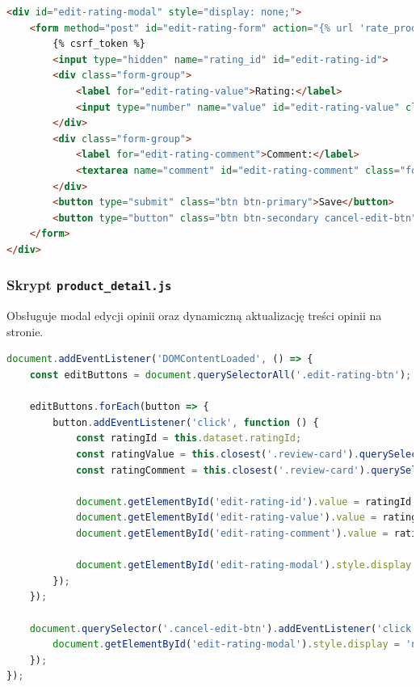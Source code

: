 \documentclass[12pt,a4paper,oneside]{article}
\theoremstyle{definition}
\numberwithin{equation}{section}
\begin{document}
\begin{lstlisting}[language=HTML, caption=Fragment \texttt{product\_detail.html}]
<div id="edit-rating-modal" style="display: none;">
    <form method="post" id="edit-rating-form" action="{% url 'rate_product' product.id %}" data-product-id="{{ product.id }}">
        {% csrf_token %}
        <input type="hidden" name="rating_id" id="edit-rating-id">
        <div class="form-group">
            <label for="edit-rating-value">Rating:</label>
            <input type="number" name="value" id="edit-rating-value" class="form-control" min="1" max="5" required>
        </div>
        <div class="form-group">
            <label for="edit-rating-comment">Comment:</label>
            <textarea name="comment" id="edit-rating-comment" class="form-control"></textarea>
        </div>
        <button type="submit" class="btn btn-primary">Save</button>
        <button type="button" class="btn btn-secondary cancel-edit-btn">Cancel</button>
    </form>
</div>
\end{lstlisting}



\subsubsection{Skrypt \texttt{product\_detail.js}}
Obsługuje modal edycji opinii oraz dynamiczną aktualizację treści opinii na stronie.

\begin{lstlisting}[language=JavaScript, caption=Fragment \texttt{product\_detail.js}]
document.addEventListener('DOMContentLoaded', () => {
    const editButtons = document.querySelectorAll('.edit-rating-btn');

    editButtons.forEach(button => {
        button.addEventListener('click', function () {
            const ratingId = this.dataset.ratingId;
            const ratingValue = this.closest('.review-card').querySelectorAll('.bi-star-fill').length;
            const ratingComment = this.closest('.review-card').querySelector('.review-comment').innerText;

            document.getElementById('edit-rating-id').value = ratingId;
            document.getElementById('edit-rating-value').value = ratingValue;
            document.getElementById('edit-rating-comment').value = ratingComment;

            document.getElementById('edit-rating-modal').style.display = 'block';
        });
    });

    document.querySelector('.cancel-edit-btn').addEventListener('click', () => {
        document.getElementById('edit-rating-modal').style.display = 'none';
    });
});
\end{lstlisting}
\end{document}
